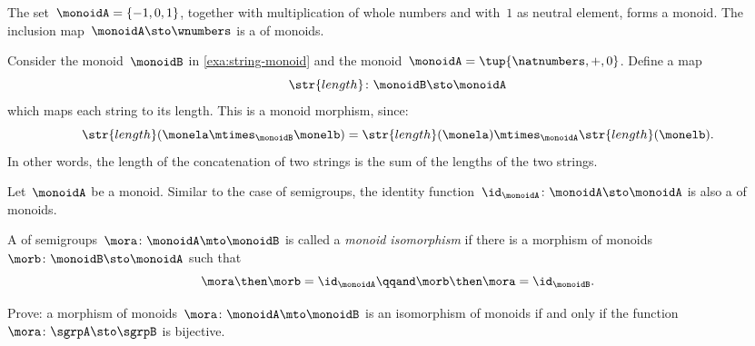 \begin{example}
  The set~$\monoidA = \{ -1, 0, 1 \}$, together with multiplication of whole numbers and with~$1$ as neutral element, forms a monoid. The inclusion map~$\monoidA \sto \wnumbers$ is a \whomo of monoids.
\end{example}

\begin{example}
  \label{exa:string-length}
  Consider the monoid~$\monoidB$ in \cref{exa:string-monoid} and the monoid~$\monoidA=\tup{\natnumbers, +,0}$.
  Define a map
  \begin{equation*}
  \str{length}\colon \monoidB \sto \monoidA
\end{equation*}
  which maps each string to its length. This is a monoid morphism, since:
\begin{equation*}
\str{length}(\monela \mtimes_\monoidB \monelb)=\str{length}(\monela)\mtimes_\monoidA \str{length}(\monelb).
\end{equation*}
  In other words, the length of the concatenation of two strings is the sum of the lengths of the two strings.
\end{example}



\begin{definition}
  \label{def:identity-mon-mor}
  Let~$\monoidA$ be a monoid. Similar to the case of semigroups, the identity function~$\id_\monoidA\colon \monoidA \sto \monoidA$ is also a \whomo of monoids.
\end{definition}



\begin{definition}
  \label{def:monoid-iso}
  A \whomo of semigroups~$\mora\colon \monoidA \mto \monoidB$ is called a \emph{monoid isomorphism} if there is a morphism of monoids~$\morb\colon \monoidB \sto \monoidA$ such that
  \begin{equation}
    \mora \then \morb = \id_\monoidA \qqand \morb \then \mora = \id_\monoidB.
  \end{equation}
\end{definition}


\begin{gradedexercise}
  Prove: a morphism of monoids~$\mora\colon \monoidA \mto \monoidB$ is an isomorphism of monoids if and only if the function~$\mora\colon \sgrpA \sto \sgrpB$ is bijective.
\end{gradedexercise}
\begin{solution}
\end{solution}


